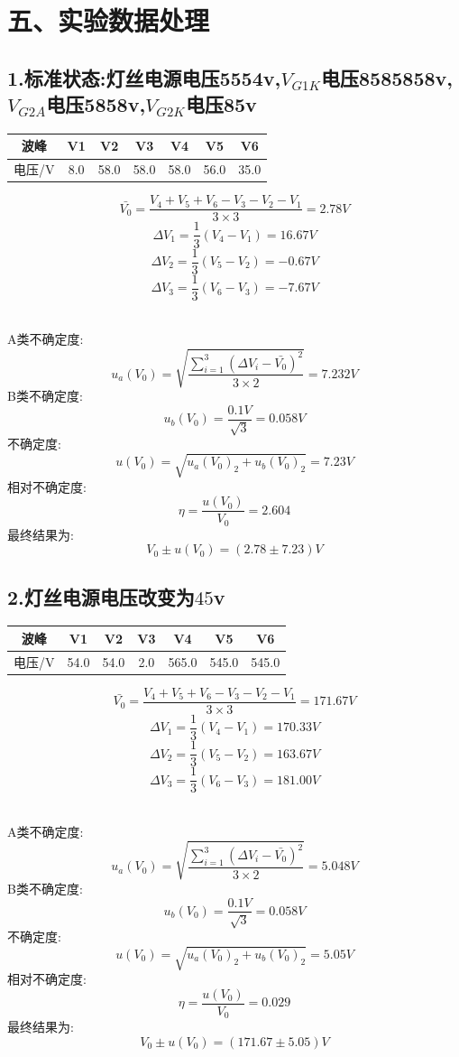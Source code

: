 \documentclass[11pt,a4paper,oneside]{article}
\begin{document}
\section*{五、实验数据处理}
\subsection*{1.标准状态:灯丝电源电压5554v,$V_{G1K}$电压8585858v,$V_{G2A}$电压5858v,$V_{G2K}$电压85v}
\begin{center}
\begin{tabular}{|c|c|c|c|c|c|c|}
	\hline
	波峰&V1&V2&V3&V4&V5&V6
	\\\hline
	电压/V&8.0&58.0&58.0&58.0&56.0&35.0\\\hline
	\end{tabular}
	\end{center}

$$  \bar{V_0}=\frac{V_4+V_5+V_6-V_3-V_2-V_1}{3\times 3}=2.78V $$
$$	\Delta V_1=\frac{1}{3}(V_4-V_1)=16.67V $$
$$	\Delta V_2=\frac{1}{3}(V_5-V_2)=-0.67V $$
$$	\Delta V_3=\frac{1}{3}(V_6-V_3)=-7.67V $$ 

\ \\
A类不确定度:
$$	u_a(V_0)=\sqrt{\frac{\sum\limits_{i=1}^{3} (\Delta V_i-\bar{V_0})^2}{3\times 2}}=7.232V $$
B类不确定度:
$$	u_b(V_0)=\frac{0.1V}{\sqrt{3}}=0.058V $$
不确定度:
$$	u(V_0)=\sqrt{u_a(V_0)_2+u_b(V_0)_2}=7.23V $$
相对不确定度:
$$	\eta=\frac{u(V_0)}{V_0}=2.604 $$
最终结果为:
$$	V_0 \pm u(V_0) = (2.78 \pm 7.23)V $$


\subsection*{2.灯丝电源电压改变为$45$v}
\begin{center}
\begin{tabular}{|c|c|c|c|c|c|c|}
	\hline
	波峰&V1&V2&V3&V4&V5&V6
	\\\hline
	电压/V&54.0&54.0&2.0&565.0&545.0&545.0\\\hline
	\end{tabular}
	\end{center}

$$  \bar{V_0}=\frac{V_4+V_5+V_6-V_3-V_2-V_1}{3\times 3}=171.67V $$
$$	\Delta V_1=\frac{1}{3}(V_4-V_1)=170.33V $$
$$	\Delta V_2=\frac{1}{3}(V_5-V_2)=163.67V $$
$$	\Delta V_3=\frac{1}{3}(V_6-V_3)=181.00V $$ 

\ \\
A类不确定度:
$$	u_a(V_0)=\sqrt{\frac{\sum\limits_{i=1}^{3} (\Delta V_i-\bar{V_0})^2}{3\times 2}}=5.048V $$
B类不确定度:
$$	u_b(V_0)=\frac{0.1V}{\sqrt{3}}=0.058V $$
不确定度:
$$	u(V_0)=\sqrt{u_a(V_0)_2+u_b(V_0)_2}=5.05V $$
相对不确定度:
$$	\eta=\frac{u(V_0)}{V_0}=0.029 $$
最终结果为:
$$	V_0 \pm u(V_0) = (171.67 \pm 5.05)V $$
\end{document}
